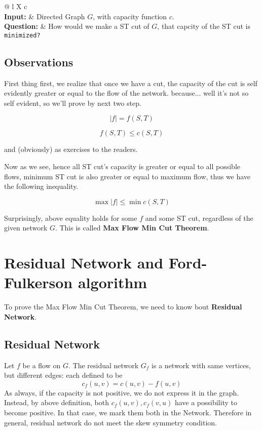 \documentclass[12pt]{article}
\begin{document}
\begin{tabularx}{\textwidth}{@{\hspace{\parindent}} l X c}
    \\%
   \textbf{Input:} & Directed Graph $G$, with capacity function $c$. \\%
   \textbf{Question:} & How would we make a ST cut of $G$, that capcity of the ST cut is \texttt{minimized?} %
 \end{tabularx}

\subsection{Observations}

First thing first, we realize that once we have a cut, the capacity of the cut is self evidently greater or equal to the flow of the network. because... well it's not so self evident, so we'll prove by next two step.

$$|f| = f(S,T)$$

$$f(S,T) \leq c(S,T)$$

and (obviously) as exercises to the readers.

Now as we see, hence all ST cut's capacity is greater or equal to all possible flows, minimum ST cut is also greater or equal to maximum flow, thus we have the following inequality.

$$\max |f| \leq \min c(S,T)$$

Surprisingly, above equality holds for some $f$ and some ST cut, regardless of the given network $G$. This is called \textbf{Max Flow Min Cut Theorem}.

\section{Residual Network and Ford-Fulkerson algorithm}

To prove the Max Flow Min Cut Theorem, we need to know bout \textbf{Residual Network}.
\subsection{Residual Network}
Let $f$ be a flow on $G$. The residual network $G_f$ is a network with same vertices, but different edges: each defined to be
$$c_f(u,v) = c(u,v) - f(u,v) $$
As always, if the capacity is not positive, we do not express it in the graph.  Instead, by above definition, both $c_f(u,v),c_f(v,u)$ have a possibility to become positive. In that case, we mark them both in the Network. Therefore in general, residual network do not meet the skew symmetry condition.
\end{document}
